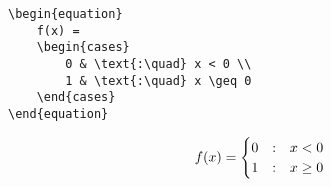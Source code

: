 \begin{minipage}{0.5\textwidth}
    \begin{lstlisting}
\begin{equation}
    f(x) =
    \begin{cases}
        0 & \text{:\quad} x < 0 \\
        1 & \text{:\quad} x \geq 0
    \end{cases}
\end{equation}
\end{lstlisting}
\end{minipage}
\hfill
\begin{minipage}{0.5\textwidth}
    \begin{equation}
        f(x) =
        \begin{cases}
            0 & \text{:\quad} x < 0    \\
            1 & \text{:\quad} x \geq 0
        \end{cases}
    \end{equation}
\end{minipage}
